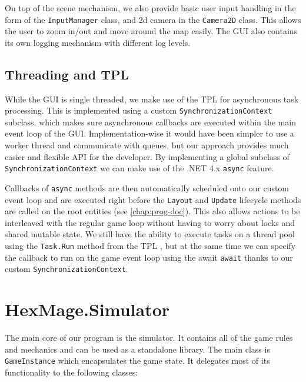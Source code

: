 On top of the scene mechanism, we also provide basic user input handling in the form of the \verb|InputManager| class, and 2d camera in the \verb|Camera2D| class. This allows the user to zoom in/out and move around the map easily. The GUI also contains its own logging mechanism with different log levels.

\subsection{Threading and TPL}
\label{threading-tpl}

While the GUI is single threaded, we make use of the TPL for asynchronous task processing. This is implemented using a custom \verb|SynchronizationContext| subclass, which makes sure asynchronous callbacks are executed within the main event loop of the GUI. Implementation-wise it would have been simpler to use a worker thread and communicate with queues, but our approach provides much easier and flexible API for the developer. By implementing a global subclass of \verb|SynchronizationContext| we can make use of the .NET 4.x \verb|async| \citep{async} feature. 

Callbacks of \verb|async| methods are then automatically scheduled onto our custom event loop and are executed right before the \verb|Layout| and \verb|Update| lifecycle methods are called on the root entities (see \autoref{chap:prog-doc}). This also allows actions to be interleaved with the regular game loop without having to worry about locks and shared mutable state. We still have the ability to execute tasks on a thread pool using the \verb|Task.Run| method from the TPL \citep{tpl}, but at the same time we can specify the callback to run on the game event loop using the await \verb|await| thanks to our custom \verb|SynchronizationContext|.

\section{HexMage.Simulator}
\label{sec:simulator}

The main core of our program is the simulator. It contains all of the game rules and mechanics and can be used as a standalone library. The main class is \verb|GameInstance| which encapsulates the game state. It delegates most of its functionality to the following classes:

